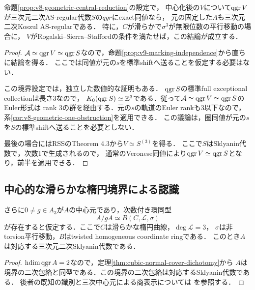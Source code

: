 \documentclass[11pt,a4paper]{ltjsarticle}
\begin{document}
\begin{corollary}[中心化後の認識から元の三乗根の認識へ]
\label{cor:v8-recognized-cover-root}
命題\ref{prop:v8-geometric-central-reduction}の設定で，
中心化後の$V$について$\operatorname{qgr} V$が三次元二次AS-regular代数$S$の$qgr$にexact同値なら，
元の固定した$A$も三次元二次Koszul AS-regularである．
特に，$C$が滑らかで$\sigma^3$が無限位数の平行移動の場合に，
$V$がRogalski--Sierra--Stafford\cite[Notation 3.2, (4.1)--(4.2)]{RSS}の条件を満たせば，この結論が成立する．
\end{corollary}
\begin{proof}
$\mathcal A\simeq\operatorname{qgr} V\simeq\operatorname{qgr} S$なので，命題\ref{prop:v9-marking-independence}から直ちに結論を得る．
ここでは同値が元の$s$を標準shiftへ送ることを仮定する必要はない．

この境界設定では，独立した数値的な証明もある．
$\operatorname{qgr} S$の標準full exceptional collectionは長さ$3$なので，
$K_0(\operatorname{qgr} S)\simeq\mathbb Z^3$である．従って$\mathcal A\simeq\operatorname{qgr} V\simeq\operatorname{qgr} S$のEuler形式は
rank $3$の群を経由する．元の$s$の軌道のEuler rankも$3$以下なので，
系\ref{cor:v8-geometric-one-obstruction}を適用できる．
この議論は，圏同値が元の$s$を$S$の標準shiftへ送ることを必要としない．

最後の場合にはRSSのTheorem 4.3から$V\simeq S^{(3)}$を得る．
ここで$S$はSklyanin代数で，次数$1$で生成されるので，
通常のVeronese同値により$\operatorname{qgr} V\simeq\operatorname{qgr} S$となり，前半を適用できる．
\end{proof}

\subsection{中心的な滑らかな楕円境界による認識}

\begin{proposition}[既知の被覆認識の適用]\label{prop:elliptic}
さらに$0\ne g\in A_3$が$A$の中心元であり，次数付き環同型
\[
 A/gA\simeq B(C,\mathcal L,\sigma)
\]
が存在すると仮定する．ここで$C$は滑らかな楕円曲線，$\deg\mathcal L=3$，
$\sigma$は非torsion平行移動，$B$はtwisted homogeneous coordinate ringである．
このとき$A$は対応する三次元二次Sklyanin代数である．
\end{proposition}
\begin{proof}
$\operatorname{hdim}\operatorname{qgr} A=2$なので，定理\ref{thm:cubic-normal-cover-dichotomy}から
$A$は境界の二次包絡と同型である．この境界の二次包絡は対応するSklyanin代数である．
後者の既知の識別と三次中心元による商表示については
\cite[Proposition 4.5, Remark 4.6]{RSS}を参照する．
\end{proof}
\end{document}
